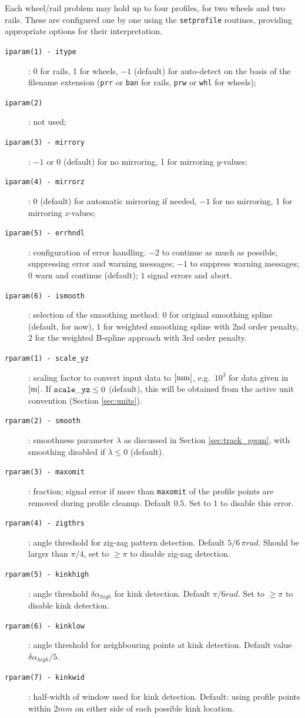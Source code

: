 \documentclass[12pt]{report}
\begin{document}
Each wheel/rail problem may hold up to four profiles, for two wheels and
two rails. These are configured one by one using the {\tt setprofile}
routines, providing appropriate options for their interpretation.
\begin{description}
\item[\tt iparam(1) - itype]: 0 for rails, 1 for wheels, $-1$ (default)
        for auto-detect on the basis of the filename extension ({\tt prr}
        or {\tt ban} for rails, {\tt prw} or {\tt whl} for wheels);
\item[\tt iparam(2)]: not used;
\item[\tt iparam(3) - mirrory]: $-1$ or 0 (default) for no mirroring, 
        1 for mirroring $y$-values;
\item[\tt iparam(4) - mirrorz]: 0 (default) for automatic mirroring if
        needed, $-1$ for no mirroring, 1 for mirroring $z$-values;
\item[\tt iparam(5) - errhndl]: configuration of error handling.
        $-2$ to continue as much as possible, suppressing error and warning
        messages; $-1$ to suppress warning messages; $0$ warn and continue
        (default); $1$ signal errors and abort.
\item[\tt iparam(6) - ismooth]: selection of the smoothing
        method: $0$ for original smoothing spline (default, for now), $1$
        for weighted smoothing spline with 2nd order penalty, $2$ for
        the weighted B-spline approach with 3rd order penalty.
\item[\tt rparam(1) - scale\_yz]: scaling factor to convert input data
        to $[\mathrm{mm}]$, e.g.\ $10^3$ for data given in $[\mathrm{m}]$. If ${\tt
        scale\_yz}\le 0$ (default), this will be obtained from the active unit
        convention (Section \ref{sec:units}).
\item[\tt rparam(2) - smooth]: smoothness parameter $\lambda$ as
        discussed in Section \ref{sec:track_geom}, with smoothing disabled
        if $\lambda\le 0$ (default).
\item[\tt rparam(3) - maxomit]: fraction; signal error if more
        than {\tt maxomit} of the profile points are removed during
        profile cleanup. Default $0.5$. Set to 1 to disable this error.
\item[\tt rparam(4) - zigthrs]: angle threshold for zig-zag pattern
        detection. Default $5/6\,\pi\unit{rad}$. Should be larger than
        $\pi/4$, set to $\ge\pi$ to disable zig-zag detection.
\item[\tt rparam(5) - kinkhigh]: angle threshold $\delta\alpha_{high}$ for
        kink detection. Default $\pi/6\unit{rad}$. Set to $\ge\pi$ to disable
        kink detection.
\item[\tt rparam(6) - kinklow]: angle threshold for neighbouring points at
        kink detection. Default value $\delta\alpha_{high}/5$.
\item[\tt rparam(7) - kinkwid]: half-width of window used for kink detection.
        Default: using profile points within $2\unit{mm}$ on either side of
        each possible kink location.
\end{description}
\end{document}
